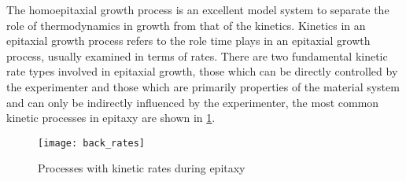 The homoepitaxial growth process is an excellent model system to separate the role of thermodynamics in growth from that of the kinetics. Kinetics in an epitaxial growth process refers to the role time plays in an epitaxial growth process, usually examined in terms of rates. There are two fundamental kinetic rate types involved in epitaxial growth, those which can be directly controlled by the experimenter and those which are primarily properties of the material system and can only be indirectly influenced by the experimenter, the most common kinetic processes in epitaxy are shown in \cref{fig:back_epi_rates}.
\begin{figure}
    \centering
    \texttt{[image: back\_rates]}
    \caption[Kinetic Processes]{\label{fig:back_epi_rates}Processes with kinetic rates during epitaxy}
\end{figure}

